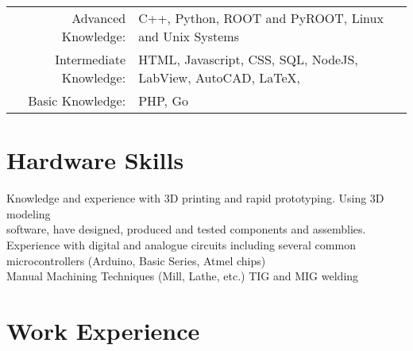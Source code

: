 \documentclass[a4paper,10pt]{article} %
\begin{document}
\begin{tabular}{rl}

Advanced Knowledge: & C++, Python, ROOT and PyROOT, Linux and Unix Systems \\
Intermediate Knowledge: & HTML, Javascript, CSS, SQL, NodeJS, LabView, AutoCAD, \LaTeX, \\
Basic Knowledge:        & PHP, Go
\end{tabular}
\vspace{1mm}


\section{Hardware Skills}
Knowledge and experience with 3D printing and rapid prototyping. Using 3D modeling\\
software, have designed, produced and tested components and assemblies.\\
Experience with digital and analogue circuits including several common microcontrollers (Arduino, Basic Series, Atmel chips) \\
Manual Machining Techniques (Mill, Lathe, etc.) TIG and MIG welding\\
\vspace{0mm}



\section{Work Experience}
\end{document}
